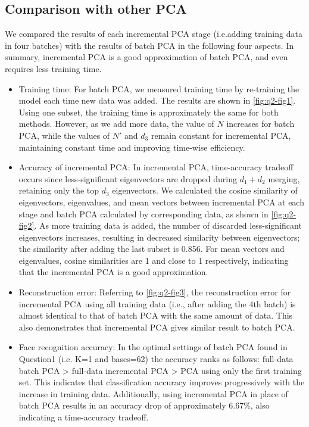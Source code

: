\subsection{Comparison with other PCA}
We compared the results of each incremental PCA stage (i.e.adding training data in four batches) with the results of batch PCA in the following four aspects. In summary, incremental PCA is a good approximation of batch PCA, and even requires less training time.
\begin{itemize}
	\item Training time: For batch PCA, we measured training time by re-training the model each time new data was added. The results are shown in \cref{fig:q2-fig1}. Using one subset, the training time is approximately the same for both methods. However, as we add more data, the value of $N$ increases for batch PCA, while the values of $N'$ and $d_3$ remain constant for incremental PCA, maintaining constant time and improving time-wise efficiency.
	
	\item Accuracy of incremental PCA: In incremental PCA, time-accuracy tradeoff occurs since less-significant eigenvectors are dropped during $d_1 + d_2$ merging, retaining only the top $d_3$ eigenvectors. We calculated the cosine similarity of eigenvectors, eigenvalues, and mean vectors between incremental PCA at each stage and batch PCA calculated by corresponding data, as shown in \cref{fig:q2-fig2}. As more training data is added, the number of discarded less-significant eigenvectors increases, resulting in decreased similarity between eigenvectors; the similarity after adding the last subset is 0.856. For mean vectors and eigenvalues, cosine similarities are 1 and close to 1 respectively, indicating that the incremental PCA is a good approximation.
	
	\item Reconstruction error: Referring to \cref{fig:q2-fig3}, the reconstruction error for incremental PCA using all training data (i.e., after adding the 4th batch) is almost identical to that of batch PCA with the same amount of data. This also demonstrates that incremental PCA gives similar result to batch PCA.
	
	\item Face recognition accuracy: In the optimal settings of batch PCA found in Question1 (i.e. K=1 and bases=62) the accuracy ranks as follows: full-data batch PCA > full-data incremental PCA > PCA using only the first training set. This indicates that classification accuracy improves progressively with the increase in training data. Additionally, using incremental PCA in place of batch PCA results in an accuracy drop of approximately 6.67\%, also indicating a time-accuracy tradeoff.
	
\end{itemize}

